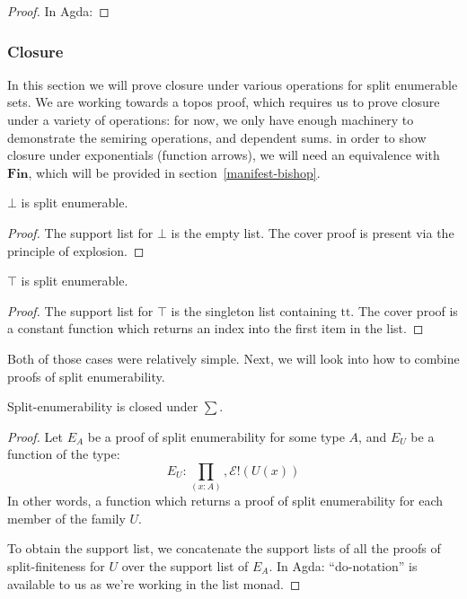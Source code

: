\begin{refsection}
\begin{proof}
  In Agda:
\end{proof}
\subsubsection{Closure}
In this section we will prove closure under various operations for split
enumerable sets.
We are working towards a topos proof, which requires us to prove closure under
a variety of operations: for now, we only have enough machinery to demonstrate
the semiring operations, and dependent sums.
in order to show closure under exponentials (function arrows), we will need an
equivalence with \(\mathbf{Fin}\), which will be provided in
section~\ref{manifest-bishop}.
\begin{lemma}
  \(\bot\) is split enumerable.
\end{lemma}
\begin{proof}
  The support list for \(\bot\) is the empty list.
  The cover proof is present via the principle of explosion.
\end{proof}
\begin{lemma}
  \(\top\) is split enumerable.
\end{lemma}
\begin{proof}
  The support list for \(\top\) is the singleton list containing \(\text{tt}\).
  The cover proof is a constant function which returns an index into the first
  item in the list.
\end{proof}
Both of those cases were relatively simple.
Next, we will look into how to combine proofs of split enumerability.
\begin{theorem}
  Split-enumerability is closed under \(\sum\).
\end{theorem}
\begin{proof}
  Let \(E_A\) be a proof of split enumerability for some type \(A\), and \(E_U\)
  be a function of the type:
  \begin{equation}
    E_U : \prod_{(x : A)} , \mathcal{E}!(U(x))
  \end{equation}
  In other words, a function which returns a proof of split enumerability for
  each member of the family \(U\).

  To obtain the support list, we concatenate the support lists of all the proofs
  of split-finiteness for \(U\) over the support list of \(E_A\).
  In Agda:
  ``do-notation'' is available to us as we're working in the list monad.


\end{proof}
\end{refsection}
